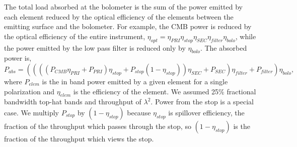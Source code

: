 \documentclass[]{spie}  %
\begin{document}
The total load absorbed at the bolometer is the sum of the power emitted by each element reduced by the optical efficiency of the elements between 
the emitting surface and the bolometer.  For example, the CMB power is reduced by the optical efficiency of the entire instrument, 
$\eta_{opt} = \eta_{PRI}\eta_{stop}\eta_{SEC}\eta_{filter}\eta_{bolo}$, while the power emitted by the low pass filter is reduced only by $\eta_{bolo}$.
The absorbed power is,
\begin{equation}
\label{eq:load}
P_{abs} =  (((( P_{CMB} \eta_{PRI} + P_{PRI} ) \eta_{stop} + P_{stop}(1-\eta_{stop}) ) \eta_{SEC} + P_{SEC})\eta_{filter} + P_{filter}) \eta_{bolo},
\end{equation} 
where $P_{elem}$ is the in band power emitted by a given element for a single polarization and $\eta_{elem}$ is the efficiency 
of the element. We assumed 25\% 
fractional bandwidth top-hat bands and throughput of $\lambda^2$. Power from the stop is a special case. We multiply $P_{stop}$ by 
$(1-\eta_{stop})$ because $\eta_{stop}$ is spillover efficiency, the fraction of the throughput which passes through the stop, so $(1-\eta_{stop})$ 
is the fraction of the throughput which views the stop.  
\end{document}
